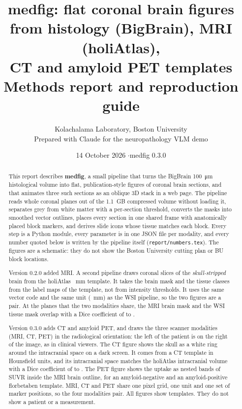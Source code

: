 \documentclass[10pt,a4paper]{article}
\title{\textbf{medfig}: flat coronal brain figures\\from histology (BigBrain), MRI (holiAtlas),\\CT and amyloid PET templates\\[4pt]
\large Methods report and reproduction guide}
\author{Kolachalama Laboratory, Boston University\\\small Prepared with Claude for the neuropathology VLM demo}
\date{14 October 2026 \quad$\cdot$\quad medfig 0.3.0}
\newcommand{\code}[1]{\texttt{#1}}
\begin{document}
\maketitle

\begin{abstract}
\noindent
This report describes \textbf{medfig}, a small pipeline that turns the BigBrain \SI{100}{\micro\metre} histological volume into flat,
publication-style figures of coronal brain sections, and that animates three such sections as an oblique 3D stack in a web page.
The pipeline reads whole coronal planes out of the 1.1~GB compressed volume without loading it, separates grey from white matter
with a per-section threshold, converts the masks into smoothed vector outlines, places every section in one shared frame with
anatomically placed block markers, and derives slide icons whose tissue matches each block. Every step is a Python module, every
parameter is in one JSON file per modality, and every number quoted below is written by the pipeline itself (\code{report/numbers.tex}).
The figures are a schematic: they do not show the Boston University cutting plan or BU block locations.

\smallskip\noindent
Version 0.2.0 added MRI. A second pipeline draws coronal slices of the \emph{skull-stripped} brain from the holiAtlas
\mVoxel~mm template. It takes the brain mask and the tissue classes from the label maps of the template, not from intensity
thresholds. It uses the same vector code and the same unit (\mUnit~mm) as the WSI pipeline, so the two figures
are a pair. At the planes that the two modalities share, the MRI brain mask and the WSI tissue mask overlap with a Dice
coefficient of \mDiceMin{} to \mDiceMax.

\smallskip\noindent
Version 0.3.0 adds CT and amyloid PET, and draws the three scanner modalities (MRI, CT, PET) in the radiological orientation:
the left of the patient is on the right of the image, as in clinical viewers. The CT figure shows the skull as a white ring
around the intracranial space on a dark screen. It comes from a CT template in Hounsfield units, and its intracranial space
matches the holiAtlas intracranial volume with a Dice coefficient of \ctDiceIcvMin{} to \ctDiceIcvMax. The PET figure shows
the uptake as nested bands of SUVR inside the MRI brain outline, for an amyloid-negative and an amyloid-positive florbetaben
template. MRI, CT and PET share one pixel grid, one unit and one set of marker positions, so the four modalities pair.
All figures show templates. They do not show a patient or a measurement.
\end{abstract}
\end{document}
